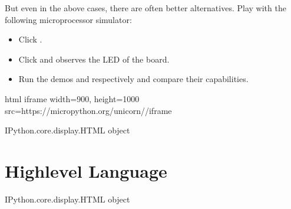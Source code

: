 \documentclass[letterpaper,10pt,english]{sphinxmanual}
\begin{document}
But even in the above cases, there are often better alternatives. Play with the following microprocessor simulator:
\begin{itemize}
\item {} 
Click .

\item {} 
Click  and observes the LED of the board.

\item {} 
Run the demos  and  respectively and compare their capabilities.

\end{itemize}

\begin{sphinxVerbatim}[commandchars=\\\{\}]
\PYGZpc{}\PYGZpc{}html
\PYGZlt{}iframe width=\PYGZdq{}900\PYGZdq{}, height=\PYGZdq{}1000\PYGZdq{} src=\PYGZdq{}https://micropython.org/unicorn/\PYGZdq{}\PYGZgt{}\PYGZlt{}/iframe\PYGZgt{}
\end{sphinxVerbatim}

\begin{sphinxVerbatim}[commandchars=\\\{\}]
\PYGZlt{}IPython.core.display.HTML object\PYGZgt{}
\end{sphinxVerbatim}


\section{High\sphinxhyphen{}level Language}
\label{\detokenize{Lecture1/Introduction to Computer Programming:high-level-language}}
\begin{sphinxVerbatim}[commandchars=\\\{\}]
    
\end{sphinxVerbatim}

\begin{sphinxVerbatim}[commandchars=\\\{\}]
\PYGZlt{}IPython.core.display.HTML object\PYGZgt{}
\end{sphinxVerbatim}
\end{document}
